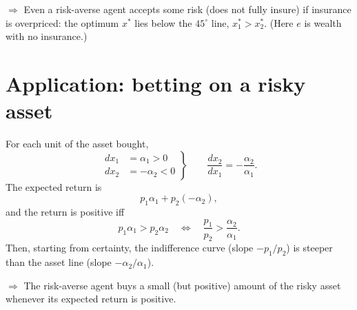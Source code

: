 \documentclass[11pt]{article}
\begin{document}
\begin{center}
\end{center}

$\Rightarrow$ Even a risk-averse agent accepts some risk (does not fully insure) if
insurance is overpriced: the optimum $x^*$ lies below the $45^\circ$ line, $x_1^*>x_2^*$.
(Here $e$ is wealth with no insurance.)


\section{Application: betting on a risky asset}

For each unit of the asset bought,
\[ \left.\begin{aligned} dx_1&=\alpha_1>0\\ dx_2&=-\alpha_2<0 \end{aligned}\right\}
   \qquad \frac{dx_2}{dx_1}=-\frac{\alpha_2}{\alpha_1}. \]
The expected return is
\[ p_1\alpha_1+p_2(-\alpha_2), \]
and the return is positive iff
\[ p_1\alpha_1>p_2\alpha_2 \quad\Longleftrightarrow\quad \frac{p_1}{p_2}>\frac{\alpha_2}{\alpha_1}. \]
Then, starting from certainty, the indifference curve (slope $-p_1/p_2$) is steeper than
the asset line (slope $-\alpha_2/\alpha_1$).

$\Rightarrow$ The risk-averse agent buys a small (but positive) amount of the risky
asset whenever its expected return is positive.
\end{document}
